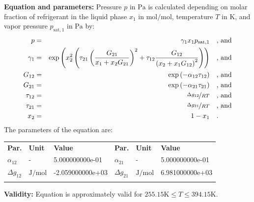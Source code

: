 \textbf{Equation and parameters:}
\newline
%
Pressure $p$ in $\si{\pascal}$ is calculated depending on molar fraction of refrigerant in the liquid phase $x_1$ in $\si{\mole\per\mole}$, temperature $T$ in $\si{\kelvin}$, and vapor pressure $p_\mathrm{sat,1}$ in $\si{\pascal}$ by:
%
\begin{equation*}
\begin{split}
p &=& \gamma_1 x_1 p_\mathrm{sat,1} & \quad\text{, and} \\
\gamma_1 &=& \exp \left( x_2^2 \left( \tau_{21} \left( \frac{G_{21}}{x_1 + x_2 G_{21}} \right) ^2 + \tau_{12} \frac{G_{12}}{\left( x_2 + x_1 G_{12} \right) ^2}\right) \right) & \quad\text{, and} \\
G_{12} &=& \exp \left( -\alpha_{12} \tau_{12} \right) & \quad\text{, and} \\
G_{21} &=& \exp \left( -\alpha_{21} \tau_{21} \right) & \quad\text{, and} \\
\tau_{12} &=& \nicefrac{\Delta g_{12}}{R T} & \quad\text{, and} \\
\tau_{21} &=& \nicefrac{\Delta g_{21}}{R T} & \quad\text{, and} \\
x_2 &=& 1 - x_1  & \quad\text{.} \\
\end{split}
\end{equation*}
%
The parameters of the equation are:
%
\begin{longtable}[l]{lll|lll}
\toprule
\addlinespace
\textbf{Par.} & \textbf{Unit} & \textbf{Value} &	\textbf{Par.} & \textbf{Unit} & \textbf{Value} \\
\addlinespace
\midrule
\endhead

\bottomrule
\endfoot
\bottomrule
\endlastfoot
\addlinespace

$\alpha_{12}$ & - & 5.000000000e-01 & $\alpha_{21}$ & - & 5.000000000e-01 \\
$\Delta g_{12}$ & $\si{\joule\per\mole}$ & -2.059000000e+03 & $\Delta g_{21}$ & $\si{\joule\per\mole}$ & 6.981000000e+03 \\

\addlinespace\end{longtable}

\textbf{Validity:}
\newline
Equation is approximately valid for $255.15 \si{\kelvin} \leq T \leq 394.15 \si{\kelvin}$.
\newline

